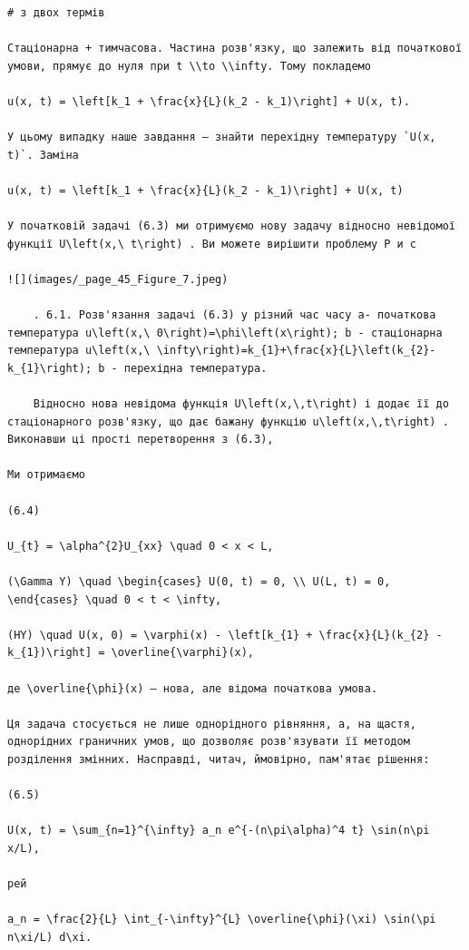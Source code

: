 \documentclass[
  ukrainian,
]{article}
\begin{document}
\begin{verbatim}
# з двох термів

Стаціонарна + тимчасова. Частина розв'язку, що залежить від початкової умови, прямує до нуля при t \\to \\infty. Тому покладемо

u(x, t) = \left[k_1 + \frac{x}{L}(k_2 - k_1)\right] + U(x, t).

У цьому випадку наше завдання — знайти перехідну температуру `U(x, t)`. Заміна

u(x, t) = \left[k_1 + \frac{x}{L}(k_2 - k_1)\right] + U(x, t)

У початковій задачі (6.3) ми отримуємо нову задачу відносно невідомої функції U\left(x,\ t\right) . Ви можете вирішити проблему Р и с

![](images/_page_45_Figure_7.jpeg)

    . 6.1. Розв'язання задачі (6.3) у різний час часу a- початкова температура u\left(x,\ 0\right)=\phi\left(x\right); b - стаціонарна температура u\left(x,\ \infty\right)=k_{1}+\frac{x}{L}\left(k_{2}-k_{1}\right); b - перехідна температура.

    Відносно нова невідома функція U\left(x,\,t\right) і додає її до стаціонарного розв'язку, що дає бажану функцію u\left(x,\,t\right) . Виконавши ці прості перетворення з (6.3),

Ми отримаємо

(6.4)

U_{t} = \alpha^{2}U_{xx} \quad 0 < x < L,

(\Gamma Y) \quad \begin{cases} U(0, t) = 0, \\ U(L, t) = 0, \end{cases} \quad 0 < t < \infty,

(HY) \quad U(x, 0) = \varphi(x) - \left[k_{1} + \frac{x}{L}(k_{2} - k_{1})\right] = \overline{\varphi}(x),

де \overline{\phi}(x) — нова, але відома початкова умова.

Ця задача стосується не лише однорідного рівняння, а, на щастя, однорідних граничних умов, що дозволяє розв'язувати її методом розділення змінних. Насправді, читач, ймовірно, пам'ятає рішення:

(6.5)

U(x, t) = \sum_{n=1}^{\infty} a_n e^{-(n\pi\alpha)^4 t} \sin(n\pi x/L),

рей

a_n = \frac{2}{L} \int_{-\infty}^{L} \overline{\phi}(\xi) \sin(\pi n\xi/L) d\xi.


\end{verbatim}
\end{document}
